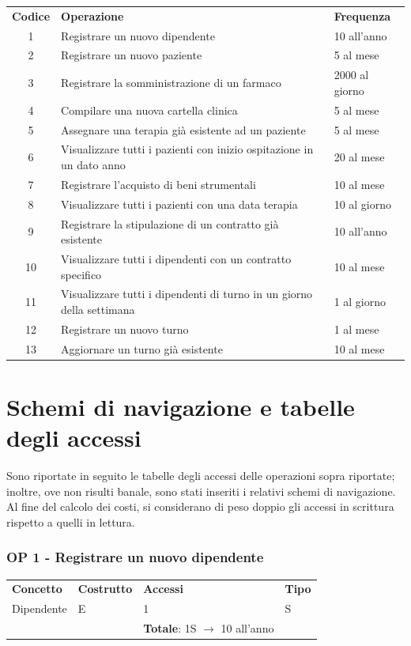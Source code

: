 \documentclass[a4paper, 12pt]{report}
\begin{document}
\renewcommand{\arraystretch}{1.2}
\begin{tabularx}{\textwidth}{cXl}
        \rowcolor{seaGreen}
        \textbf{Codice} & \textbf{Operazione} & \textbf{Frequenza} \\
        1 & Registrare un nuovo dipendente & 10 all'anno \\
        \hline
        2 & Registrare un nuovo paziente & 5 al mese \\
        \hline
        3 & Registrare la somministrazione di un farmaco & 2000 al giorno \\
        \hline
        4 & Compilare una nuova cartella clinica & 5 al mese \\
        \hline
        5 & Assegnare una terapia già esistente ad un paziente & 5 al mese \\
        \hline
        6 & Visualizzare tutti i pazienti con inizio ospitazione in un dato anno & 20 al mese \\
        \hline
        7 & Registrare l'acquisto di beni strumentali & 10 al mese \\
        \hline
        8 & Visualizzare tutti i pazienti con una data terapia & 10 al giorno \\
        \hline
        9 & Registrare la stipulazione di un contratto già esistente & 10 all'anno \\
        \hline
        10 & Visualizzare tutti i dipendenti con un contratto specifico & 10 al mese\\
        \hline
        11 & Visualizzare tutti i dipendenti di turno in un giorno della settimana & 1 al giorno \\
        \hline
        12 & Registrare un nuovo turno & 1 al mese \\
        \hline
        13 & Aggiornare un turno già esistente & 10 al mese \\
        \hline
\end{tabularx}

\section{Schemi di navigazione e tabelle degli accessi}
Sono riportate in seguito le tabelle degli accessi delle operazioni sopra riportate; inoltre, ove
non risulti banale, sono stati inseriti i relativi schemi di navigazione. Al fine del calcolo dei
costi, si considerano di peso doppio gli accessi in scrittura rispetto a quelli in lettura.

\subsubsection*{OP 1 - Registrare un nuovo dipendente}
\renewcommand{\arraystretch}{1.2}
\begin{tabularx}{\textwidth}{XlXl}
        \rowcolor{seaGreen}
        \textbf{Concetto} & \textbf{Costrutto} & \textbf{Accessi} & \textbf{Tipo} \\
        Dipendente & E & 1 & S \\
        \rowcolor{seaGreen}
         &  & \textbf{Totale}: 1S $\rightarrow$ 10 all'anno & \\
\end{tabularx}
\end{document}
